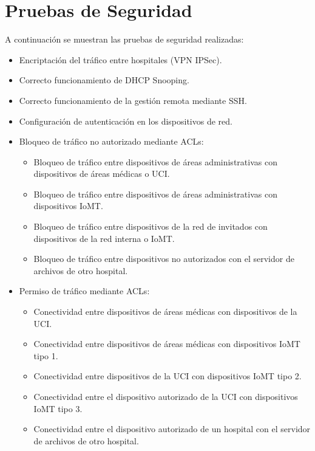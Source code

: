 \section{Pruebas de Seguridad}
A continuación se muestran las pruebas de seguridad realizadas:
\begin{itemize}
    \item Encriptación del tráfico entre hospitales (VPN IPSec).
    \item Correcto funcionamiento de DHCP Snooping.
    \item Correcto funcionamiento de la gestión remota mediante SSH.
    \item Configuración de autenticación en los dispositivos de red.
    \item Bloqueo de tráfico no autorizado mediante ACLs:
    \begin{itemize}
        \item Bloqueo de tráfico entre dispositivos de áreas administrativas con dispositivos de áreas médicas o UCI.
        \item Bloqueo de tráfico entre dispositivos de áreas administrativas con dispositivos IoMT.
        \item Bloqueo de tráfico entre dispositivos de la red de invitados con dispositivos de la red interna o IoMT.
        \item Bloqueo de tráfico entre dispositivos no autorizados con el servidor de archivos de otro hospital.
    \end{itemize}
    \item Permiso de tráfico mediante ACLs:
    \begin{itemize}
        \item Conectividad entre dispositivos de áreas médicas con dispositivos de la UCI.
        \item Conectividad entre dispositivos de áreas médicas con dispositivos IoMT tipo 1.
        \item Conectividad entre dispositivos de la UCI con dispositivos IoMT tipo 2.
        \item Conectividad entre el dispositivo autorizado de la UCI con dispositivos IoMT tipo 3.
        \item Conectividad entre el dispositivo autorizado de un hospital con el servidor de archivos de otro hospital.
    \end{itemize}
\end{itemize}
